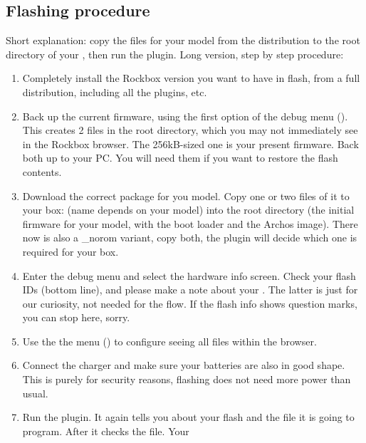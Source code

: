 \subsection{Flashing procedure}
Short explanation: copy the  files for your model from the
distribution to the root directory of your \dap, then run the 
 plugin.
Long version, step by step procedure:
\begin{enumerate}
\item Completely install the Rockbox version you want to have in flash, from a 
  full  distribution, including all the plugins, etc.
\item Back up the current firmware, using the first option of the debug menu 
  ().
  This creates 2 files in the root directory, which you may not immediately see 
  in the Rockbox browser. The 256kB-sized  one is your present firmware. Back  both up to your PC. You will need them if 
  you want to restore the flash contents.
\item Download the correct package for you model. Copy one or two files of it to 
  your box:  (name depends on your model) into the root 
  directory (the initial firmware for your model, with the boot loader and the 
  Archos image). There now is also a \_norom variant, copy both, the plugin will 
  decide which one is required for your box.
\item Enter the debug menu and select the hardware info screen. Check your flash 
  IDs (bottom line), and please make a note about your . The latter is just for our 
  curiosity, not needed for the flow. If the flash info shows question  marks, 
  you can stop here, sorry.
\item Use the the menu () to 
  configure seeing all files within the browser.
\item Connect the charger and make sure your batteries are also in good shape. 
  This is purely for security reasons, flashing does not need more power than usual.
\item Run the  plugin. It again tells you about your 
  flash and the file it is going to program. After  it checks the file. Your 

\end{enumerate}
